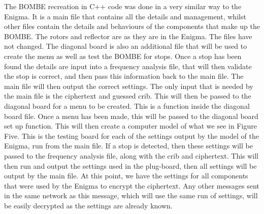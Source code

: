 \documentclass[12pt,a4paper]{article}
\begin{document}
The BOMBE recreation in C++ code was done in a very similar way to the Enigma. It is a main file that contains all the details and management, whilst other files contain the details and behaviours of the components that make up the BOMBE. The rotors and reflector are as they are in the Enigma. The files have not changed. The diagonal board is also an additional file that will be used to create the menu as well as test the BOMBE for stops. Once a stop has been found the details are input into a frequency analysis file, that will then validate the stop is correct, and then pass this information back to the main file. The main file will then output the correct settings. The only input that is needed by the main file is the ciphertext and guessed crib. This will then be passed to the diagonal board for a menu to be created. This is a function inside the diagonal board file. Once a menu has been made, this will be passed to the diagonal board set up function. This will then create a computer model of what we see in Figure Five. This is the testing board for each of the settings output by the model of the Enigma, run from the main file. If a stop is detected, then these settings will be passed to the frequency analysis file, along with the crib and ciphertext. This will then run and output the settings used in the plug-board, then all settings will be output by the main file. At this point, we have the settings for all components that were used by the Enigma to encrypt the ciphertext. Any other messages sent in the same network as this message, which will use the same run of settings, will be easily decrypted as the settings are already known.\\
\end{document}
